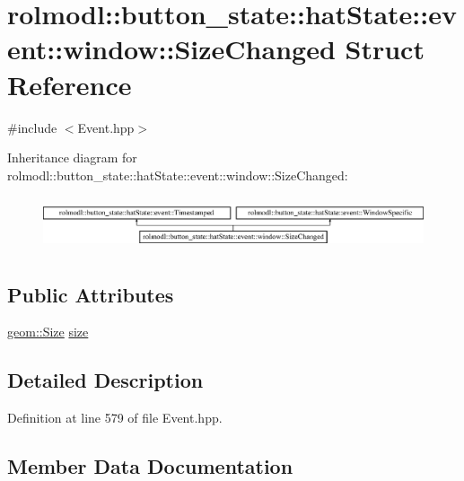 \hypertarget{structrolmodl_1_1button__state_1_1hat_state_1_1event_1_1window_1_1_size_changed}{}\section{rolmodl\+::button\+\_\+state\+::hat\+State\+::event\+::window\+::Size\+Changed Struct Reference}
\label{structrolmodl_1_1button__state_1_1hat_state_1_1event_1_1window_1_1_size_changed}


{\ttfamily \#include $<$Event.\+hpp$>$}

Inheritance diagram for rolmodl\+::button\+\_\+state\+::hat\+State\+::event\+::window\+::Size\+Changed\+:\begin{figure}[H]
\begin{center}
\leavevmode
\includegraphics[height=1.595442cm]{structrolmodl_1_1button__state_1_1hat_state_1_1event_1_1window_1_1_size_changed}
\end{center}
\end{figure}
\subsection*{Public Attributes}
\begin{DoxyCompactItemize}
\item 
\mbox{\hyperlink{structrolmodl_1_1geom_1_1_size}{geom\+::\+Size}} \mbox{\hyperlink{structrolmodl_1_1button__state_1_1hat_state_1_1event_1_1window_1_1_size_changed_a0852b0f89a7499f05aa2dbecea76b2ab}{size}}
\end{DoxyCompactItemize}


\subsection{Detailed Description}


Definition at line 579 of file Event.\+hpp.



\subsection{Member Data Documentation}
\mbox{\label{structrolmodl_1_1button__state_1_1hat_state_1_1event_1_1window_1_1_size_changed_a0852b0f89a7499f05aa2dbecea76b2ab}} 
